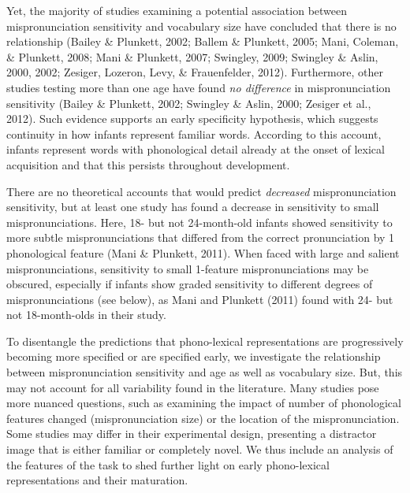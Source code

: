 \documentclass[man, noextraspace]{apa6}
\begin{document}
Yet, the majority of studies examining a potential association between mispronunciation sensitivity and vocabulary size have concluded that there is no relationship (Bailey \& Plunkett, 2002; Ballem \& Plunkett, 2005; Mani, Coleman, \& Plunkett, 2008; Mani \& Plunkett, 2007; Swingley, 2009; Swingley \& Aslin, 2000, 2002; Zesiger, Lozeron, Levy, \& Frauenfelder, 2012). Furthermore, other studies testing more than one age have found \emph{no difference} in mispronunciation sensitivity (Bailey \& Plunkett, 2002; Swingley \& Aslin, 2000; Zesiger et al., 2012). Such evidence supports an early specificity hypothesis, which suggests continuity in how infants represent familiar words. According to this account, infants represent words with phonological detail already at the onset of lexical acquisition and that this persists throughout development.

There are no theoretical accounts that would predict \emph{decreased} mispronunciation sensitivity, but at least one study has found a decrease in sensitivity to small mispronunciations. Here, 18- but not 24-month-old infants showed sensitivity to more subtle mispronunciations that differed from the correct pronunciation by 1 phonological feature (Mani \& Plunkett, 2011). When faced with large and salient mispronunciations, sensitivity to small 1-feature mispronunciations may be obscured, especially if infants show graded sensitivity to different degrees of mispronunciations (see below), as Mani and Plunkett (2011) found with 24- but not 18-month-olds in their study.

To disentangle the predictions that phono-lexical representations are progressively becoming more specified or are specified early, we investigate the relationship between mispronunciation sensitivity and age as well as vocabulary size. But, this may not account for all variability found in the literature. Many studies pose more nuanced questions, such as examining the impact of number of phonological features changed (mispronunciation size) or the location of the mispronunciation. Some studies may differ in their experimental design, presenting a distractor image that is either familiar or completely novel. We thus include an analysis of the features of the task to shed further light on early phono-lexical representations and their maturation.
\end{document}
